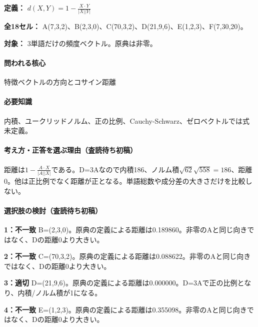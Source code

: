 \noindent\textbf{定義：} \(d(X,Y)=1-\frac{X\cdot Y}{|X||Y|}\)\par

\noindent\textbf{全18セル：} A(7,3,2)、B(2,3,0)、C(70,3,2)、D(21,9,6)、E(1,2,3)、F(7,30,20)。\par

\noindent\textbf{対象：} 3単語だけの頻度ベクトル。原典は非零。\par

\paragraph{問われる核心} 特徴ベクトルの方向とコサイン距離

\paragraph{必要知識} 内積、ユークリッドノルム、正の比例、Cauchy-Schwarz、ゼロベクトルでは式未定義。

\paragraph{考え方・正答を選ぶ理由（査読待ち初稿）} 距離は\(1-\frac{A\cdot X}{|A||X|}\)である。D=\allowbreak{}3Aなので内積186、ノルム積\(\sqrt{62}\sqrt{558}=186\)、距離0。他は正比例でなく距離が正となる。単語総数や成分差の大きさだけを比較しない。

\paragraph{選択肢の検討（査読待ち初稿）}\mbox{}\par

\noindent\textbf{1：不一致} B=\allowbreak{}(2,3,0)。原典の定義による距離は0.189860。非零のAと同じ向きではなく、Dの距離0より大きい。\par

\noindent\textbf{2：不一致} C=\allowbreak{}(70,3,2)。原典の定義による距離は0.088622。非零のAと同じ向きではなく、Dの距離0より大きい。\par

\noindent\textbf{3：適切} D=\allowbreak{}(21,9,6)。原典の定義による距離は0.000000。D=\allowbreak{}3Aで正の比例となり、内積/ノルム積が1になる。\par

\noindent\textbf{4：不一致} E=\allowbreak{}(1,2,3)。原典の定義による距離は0.355098。非零のAと同じ向きではなく、Dの距離0より大きい。\par

